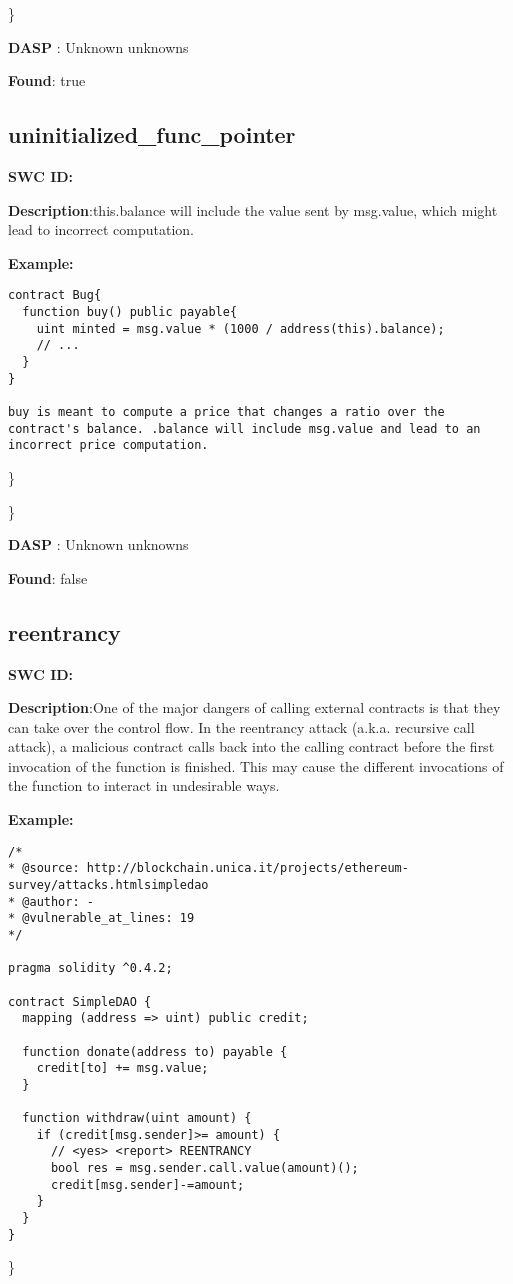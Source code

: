 \documentclass{article}
\begin{document}
\} 

\textbf{DASP} : Unknown unknowns

\textbf{Found}: true

\subsection{uninitialized\_func\_pointer} 
\textbf{SWC \textunderscore ID:} 

\textbf{Description}:this.balance will include the value sent by msg.value, which might lead to incorrect computation.


\textbf{Example:} 
\begin{verbatim}
contract Bug{
  function buy() public payable{
    uint minted = msg.value * (1000 / address(this).balance);
    // ...
  }
}

buy is meant to compute a price that changes a ratio over the contract's balance. .balance will include msg.value and lead to an incorrect price computation.

\end{verbatim}\} 

\} 

\textbf{DASP} : Unknown unknowns

\textbf{Found}: false

\subsection{reentrancy} 
\textbf{SWC \textunderscore ID:} 

\textbf{Description}:One of the major dangers of calling external contracts is that they can take over the control flow. In the reentrancy attack (a.k.a. recursive call attack), a malicious contract calls back into the calling contract before the first invocation of the function is finished. This may cause the different invocations of the function to interact in undesirable ways.


\textbf{Example:} 
\begin{verbatim}
/*
* @source: http://blockchain.unica.it/projects/ethereum-survey/attacks.htmlsimpledao
* @author: -
* @vulnerable_at_lines: 19
*/

pragma solidity ^0.4.2;

contract SimpleDAO {
  mapping (address => uint) public credit;

  function donate(address to) payable {
    credit[to] += msg.value;
  }

  function withdraw(uint amount) {
    if (credit[msg.sender]>= amount) {
      // <yes> <report> REENTRANCY
      bool res = msg.sender.call.value(amount)();
      credit[msg.sender]-=amount;
    }
  }
}

\end{verbatim}\} 
\end{document}
